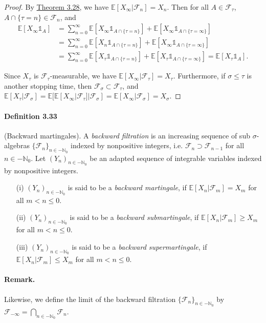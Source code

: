 \documentclass{article}
\numberwithin{equation}{section}
\newcommand{\E}{\mathbb{E}}
\theoremstyle{plain}
\theoremstyle{definition}
\begin{document}
\begin{proof}
By \hyperref[thm:3.28]{Theorem 3.28}, we have $\E[X_\infty|\mathscr{F}_n]=X_n$. Then for all $A\in\mathscr{F}_\tau$, $A\cap\{\tau=n\}\in\mathscr{F}_n$, and
\begin{align*}
	\E[X_\infty\mathds{1}_A]&=\sum_{n=0}^\infty\E\left[X_\infty\mathds{1}_{A\cap\{\tau=n\}}\right] + \E[X_\infty\mathds{1}_{A\cap\{\tau=\infty\}}]\\
	&=\sum_{n=0}^\infty\E\left[X_n\mathds{1}_{A\cap\{\tau=n\}}\right] + \E[X_\infty\mathds{1}_{A\cap\{\tau=\infty\}}]\\
	&=\sum_{n=0}^\infty\E\left[X_\tau\mathds{1}_{A\cap\{\tau=n\}}\right] + \E[X_\tau\mathds{1}_{A\cap\{\tau=\infty\}}] = \E[X_\tau\mathds{1}_A].
\end{align*}

Since $X_\tau$ is $\mathscr{F}_\tau$-measurable, we have $\E[X_\infty|\mathscr{F}_\tau]=X_\tau$. Furthermore, if $\sigma\leq\tau$ is another stopping time, then $\mathscr{F}_\sigma\subset\mathscr{F}_\tau$, and $\E[X_\tau|\mathscr{F}_\sigma]=\E[\E[X_\infty|\mathscr{F}_\tau]|\mathscr{F}_\sigma]=\E[X_\infty|\mathscr{F}_\sigma]=X_\sigma$.
\end{proof}

\paragraph{Definition 3.33\label{def:3.33}} (Backward martingales). A \textit{backward filtration} is an increasing sequence of sub $\sigma$-algebras $\{\mathscr{F}_n\}_{n\in-\mathbb{N}_0}$ indexed by nonpositive integers, i.e. $\mathscr{F}_n\supset\mathscr{F}_{n-1}$ for all $n\in-\mathbb{N}_0$. Let $(Y_n)_{n\in-\mathbb{N}_0}$ be an adapted sequence of integrable variables indexed by nonpositive integers.
\begin{itemize}
	\item[(i)] $(Y_n)_{n\in-\mathbb{N}_0}$ is said to be a \textit{backward martingale}, if $\E[X_n|\mathscr{F}_m]= X_m$ for all $m<n\leq 0$.
	\item[(ii)] $(Y_n)_{n\in-\mathbb{N}_0}$ is said to be a \textit{backward submartingale}, if $\E[X_n|\mathscr{F}_m]\geq X_m$ for all $m<n\leq 0$.
	\item[(iii)] $(Y_n)_{n\in-\mathbb{N}_0}$ is said to be a \textit{backward supermartingale}, if $\E[X_n|\mathscr{F}_m]\leq X_m$ for all $m<n\leq 0$.
\end{itemize}
\paragraph{Remark.} Likewise, we define the limit of the backward filtration $\{\mathscr{F}_n\}_{n\in-\mathbb{N}_0}$ by $\mathscr{F}_{-\infty}=\bigcap_{n\in-\mathbb{N}_0}\mathscr{F}_n$.
\end{document}

